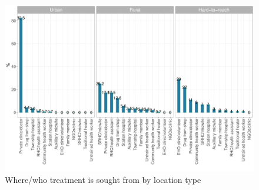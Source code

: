 \documentclass[12pt,a4paper]{article}
\begin{document}
\begin{figure}[H]

{\centering \includegraphics{kayinReport_files/figure-latex/fever6plot-1} 

}

\caption{Where/who treatment is sought from by location type}\label{fig:fever6plot}
\end{figure}
\end{document}
